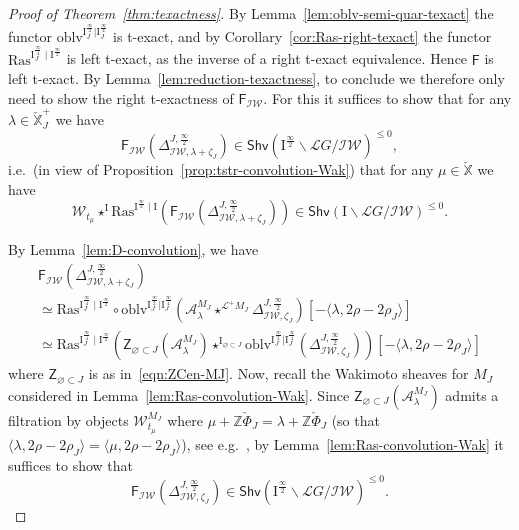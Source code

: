 \documentclass[11pt]{amsart}
\numberwithin{equation}{section}
\theoremstyle{plain}
\theoremstyle{definition}
\newcommand{\sA}{{\mathcal A}}
\newcommand{\I}{{\mathrm I}}
\newcommand{\sL}{{\mathcal L}}
\newcommand{\sW}{{\mathcal W}}
\newcommand{\X}{{\mathbb X}}
\newcommand{\Xd}{\check{\X}}
\newcommand{\Z}{{\mathbb Z}}
\newcommand{\semi}{{{\frac{\infty}{2}}}}
\newcommand{\quar}{{{\frac{\infty}{4}}}}
\newcommand{\oblv}{\mathrm{oblv}}
\newcommand{\IW}{\mathcal{IW}}
\newcommand{\Shv}{\mathsf{Shv}}
\newcommand{\Ras}{\mathrm{Ras}}
\newcommand{\ZCen}{\mathsf{Z}}
\begin{document}
\begin{proof}[Proof of Theorem~\ref{thm:texactness}]
By Lemma~\ref{lem:oblv-semi-quar-texact} the functor $\oblv^{\I_J^{\semi}|\I_J^{\quar}}$ is t-exact, and by Corollary~\ref{cor:Ras-right-texact} the functor $\mathrm{Ras}^{\I_J^{\quar}\mid \I^\semi}$ is left t-exact, as the inverse of a right t-exact equivalence. Hence $\mathsf{F}$ is left t-exact. 
By Lemma~\ref{lem:reduction-texactness}, to conclude we therefore only need to show the right t-exactness of $\mathsf{F}_\IW$. 
For this it suffices to show that for any $\lambda\in \Xd_J^+$ we have
\[
\mathsf{F}_\IW \left( \Delta^{J,\semi}_{\IW,\lambda+\zeta_J} \right) \in \Shv \left( \I^{\semi}\backslash \sL{G}/\IW \right)^{\leq 0},
\]
i.e.~(in view of Proposition~\ref{prop:tstr-convolution-Wak}) that for any $\mu \in \Xd$ we have
\[
\sW_{t_\mu} \star^\I \Ras^{\I^\semi \mid \I} \left( \mathsf{F}_\IW \left( \Delta^{J,\semi}_{\IW,\lambda+\zeta_J} \right) \right)
\in \Shv \left( \I \backslash \sL{G}/\IW \right)^{\leq 0}.
\]

By Lemma~\ref{lem:D-convolution}, we have 
\begin{multline*}
\mathsf{F}_\IW \left( \Delta^{J,\semi}_{\IW,\lambda+\zeta_J} \right) \\
\simeq \mathrm{Ras}^{\I_J^{\quar}\mid \I^\semi}\circ \oblv^{\I_J^\semi | \I_{J}^\quar } \left( \sA^{M_J}_{\lambda} \star^{\sL^+M_J} \Delta^{J,\semi}_{\IW,\zeta_J} \right) [-\langle \lambda, 2\rho-2\rho_J \rangle] \\ 
\simeq \mathrm{Ras}^{\I_J^{\quar}\mid \I^\semi} \left( \ZCen_{\varnothing \subset J}(\sA^{M_J}_{\lambda}) \star^{\I_{\varnothing \subset J}} \oblv^{\I_J^\semi | \I_J^\quar} (\Delta^{J,\semi}_{\IW,\zeta_J}) \right) [-\langle \lambda, 2\rho-2\rho_J \rangle]
\end{multline*}
where $\ZCen_{\varnothing \subset J}$ is as in~\eqref{eqn:ZCen-MJ}.
Now, recall the Wakimoto sheaves for $M_J$ considered in Lemma~\ref{lem:Ras-convolution-Wak}.
Since $\ZCen_{\varnothing \subset J}(\sA^{M_J}_{\lambda})$ admits a filtration by objects $\sW^{M_J}_{t_\mu}$ where $\mu + \Z\check{\Phi}_J = \lambda + \Z\check{\Phi}_J$ (so that $\langle \lambda, 2\rho-2\rho_J \rangle = \langle \mu, 2\rho-2\rho_J \rangle$), see e.g.~\cite[Theorem~4.4.5]{ARbook}, by Lemma~\ref{lem:Ras-convolution-Wak} it suffices to show that 
\begin{equation}
\label{eq:FIW-D}
\mathsf{F}_\IW \left( \Delta^{J,\semi}_{\IW,\zeta_J} \right) \in \Shv \left( \I^{\semi}\backslash \sL{G}/\IW \right)^{\leq 0}. 
\end{equation}


\end{proof}
\end{document}
